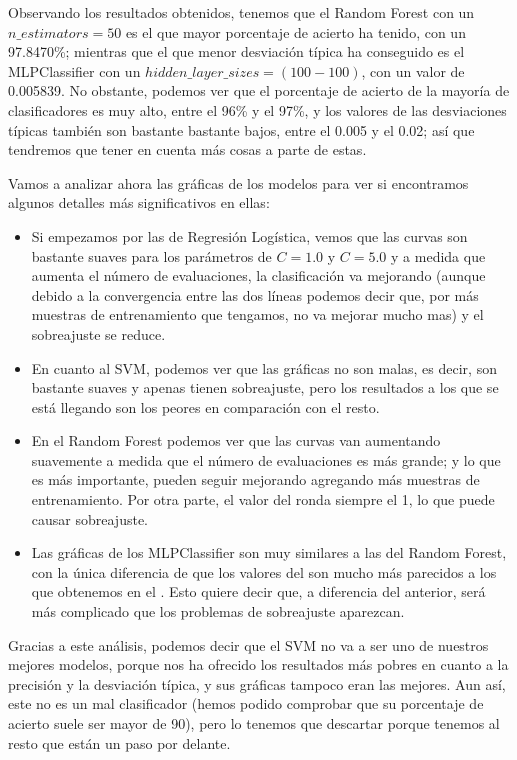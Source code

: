 \documentclass[11pt,a4paper]{article}
\begin{document}
Observando los resultados obtenidos, tenemos que el Random Forest con un $n\_estimators = 50$ es el que mayor porcentaje de acierto ha
tenido, con un 97.8470\%; mientras que el que menor desviación típica ha conseguido es el MLPClassifier con un $hidden\_layer\_sizes =
(100-100)$, con un valor de 0.005839. No obstante, podemos ver que el porcentaje de acierto de la mayoría de clasificadores es muy alto,
entre el 96\% y el 97\%, y los valores de las desviaciones típicas también son bastante bastante bajos, entre el 0.005 y el 0.02; así que
tendremos que tener en cuenta más cosas a parte de estas.

Vamos a analizar ahora las gráficas de los modelos para ver si encontramos algunos detalles más significativos en ellas:

\begin{itemize}[label=\textbullet]
\item Si empezamos por las de Regresión Logística, vemos que las curvas son bastante suaves  para los parámetros de $C = 1.0$ y $C = 5.0$ y a
medida que aumenta el número de evaluaciones, la clasificación va mejorando (aunque debido a la convergencia entre las dos líneas podemos
decir que, por más muestras de entrenamiento que tengamos, no va mejorar mucho mas) y el sobreajuste se reduce.

\item En cuanto al SVM, podemos ver que las gráficas no son malas, es decir, son bastante suaves y apenas tienen sobreajuste, pero los
resultados a
los que se está llegando son los peores en comparación con el resto.

\item En el Random Forest podemos ver que las curvas van aumentando suavemente a medida que el número de evaluaciones es más grande; y lo que es más importante, pueden seguir mejorando agregando más muestras de entrenamiento. Por otra parte, el valor del  ronda siempre el 1, lo que puede causar sobreajuste.

\item Las gráficas de los MLPClassifier son muy similares a las del Random Forest, con la única diferencia de que los valores del
 son mucho más parecidos a los que obtenemos en el . Esto quiere decir que, a diferencia del anterior, será más complicado que los problemas de sobreajuste aparezcan.
\end{itemize}
Gracias a este análisis, podemos decir que el SVM no va a ser uno de nuestros mejores modelos, porque nos ha ofrecido los resultados más
pobres en cuanto a la precisión y la desviación típica, y sus gráficas tampoco eran las mejores. Aun así, este no es un mal clasificador
(hemos podido comprobar que su porcentaje de acierto suele ser mayor de 90), pero lo tenemos que descartar porque tenemos al resto que
están un paso por delante.
\end{document}
